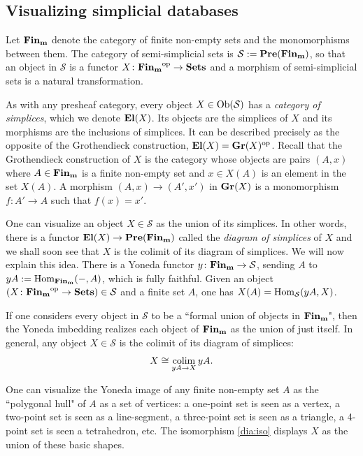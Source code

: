 \documentclass{amsart}
\def\tn{\textnormal}
\def\mc{\mathcal}
\def\Hom{\tn{Hom}}
\def\Ob{\tn{Ob}}
\def\to{\rightarrow}
\def\taking{\colon}
\def\iso{\cong}
\def\op{^\tn{op}}
\def\Sets{{\bf Sets}}
\def\Pre{{\bf Pre}}
\def\colim{\mathop{\tn{colim}}}
\def\mcS{\mc{S}}
\theoremstyle{remark}
\theoremstyle{definition}
\def\Finm{{\bf Fin_{m}}}
\def\El{{\bf El}}
\def\Gr{{\bf Gr}}
\begin{document}
\subsection{Visualizing simplicial databases}

Let $\Finm$ denote the category of finite non-empty sets and the monomorphisms between them.  The category of semi-simplicial sets is $\mcS:=\Pre(\Finm)$, so that an object in $\mcS$ is a functor $X\taking\Finm\op\to\Sets$ and a morphism of semi-simplicial sets is a natural transformation.

As with any presheaf category, every object $X\in\Ob(\mcS)$ has a {\em category of simplices}, which we denote $\El(X)$.  Its objects are the simplices of $X$ and its morphisms are the inclusions of simplices.  It can be described precisely as the opposite of the Grothendieck construction, $\El(X)=\Gr(X)\op$.  Recall that the Grothendieck construction of $X$ is the category whose objects are pairs $(A,x)$ where $A\in\Finm$ is a finite non-empty set and $x\in X(A)$ is an element in the set $X(A)$.  A morphism $(A,x)\to(A',x')$ in $\Gr(X)$ is a monomorphism $f\taking A'\to A$ such that $f(x)=x'$. 

One can visualize an object $X\in\mcS$ as the union of its simplices.  In other words, there is a functor $\El(X)\to\Pre(\Finm)$ called the {\em diagram of simplices} of $X$ and we shall soon see that $X$ is the colimit of its diagram of simplices.  We will now explain this idea.  There is a Yoneda functor $y\taking\Finm\to\mcS$, sending $A$ to $yA:=\Hom_\Finm(-,A)$, which is fully faithful.  Given an object $(X\taking\Finm\op\to\Sets)\in\mcS$ and a finite set $A$, one has $X(A)=\Hom_\mcS(yA,X)$.

If one considers every object in $\mcS$ to be a ``formal union of objects in $\Finm$", then the Yoneda imbedding realizes each object of $\Finm$ as the union of just itself.   In general, any object $X\in\mcS$ is the colimit of its diagram of simplices: \begin{align}\label{dia:iso}X\iso\colim_{yA\to X} yA.\end{align}  

One can visualize the Yoneda image of any finite non-empty set $A$ as the ``polygonal hull" of $A$ as a set of vertices: a one-point set is seen as a vertex, a two-point set is seen as a line-segment, a three-point set is seen as a triangle, a 4-point set is seen a tetrahedron, etc.  The isomorphism \ref{dia:iso} displays $X$ as the union of these basic shapes.
\end{document}
